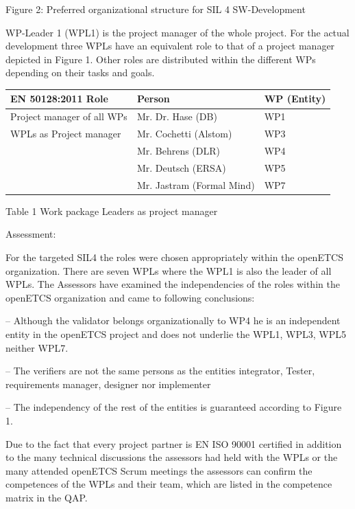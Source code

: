 Figure 2: Preferred organizational structure for SIL 4 SW-Development

WP-Leader 1 (WPL1) is the project manager of the whole project. For the actual development three WPLs have an equivalent
role to that of a project manager depicted in Figure 1. Other roles are distributed within the different WPs depending
on their tasks and goals.


\bigskip

\begin{center}
\tablefirsthead{}
\tablehead{}
\tabletail{}
\tablelasttail{}
\begin{supertabular}{|m{5.467cm}|m{5.467cm}|m{3.467cm}|}
\hline
EN 50128:2011 Role  &
Person  &
WP (Entity) \\\hline
Project manager of all WPs  &
Mr. Dr. Hase (DB)  &
WP1 \\\hline
WPLs as Project manager  &
Mr. Cochetti (Alstom)  &
WP3\\\hline
~
 &
Mr. Behrens (DLR) &
WP4\\\hline
~
 &
Mr. Deutsch (ERSA)  &
WP5\\\hline
~
 &
Mr. Jastram (Formal Mind)  &
WP7\\\hline
\end{supertabular}
\end{center}
Table 1 Work package Leaders as project manager


\bigskip

Assessment:

For the targeted SIL4 the roles were chosen appropriately within the openETCS organization. There are seven WPLs where
the WPL1 is also the leader of all WPLs. The Assessors have examined the independencies of the roles within the
openETCS organization and came to following conclusions:

{}-- Although the validator belongs organizationally to WP4 he is an independent entity in the openETCS project and does
not underlie the WPL1, WPL3, WPL5 neither WPL7.

{}-- The verifiers are not the same persons as the entities integrator, Tester, requirements manager, designer nor
implementer

{}-- The independency of the rest of the entities is guaranteed according to Figure 1.

Due to the fact that every project partner is EN ISO 90001 certified in addition to the many technical discussions the
assessors had held with the WPLs or the many attended openETCS Scrum meetings the assessors can confirm the competences
of the WPLs and their team, which are listed in the competence matrix in the QAP.

